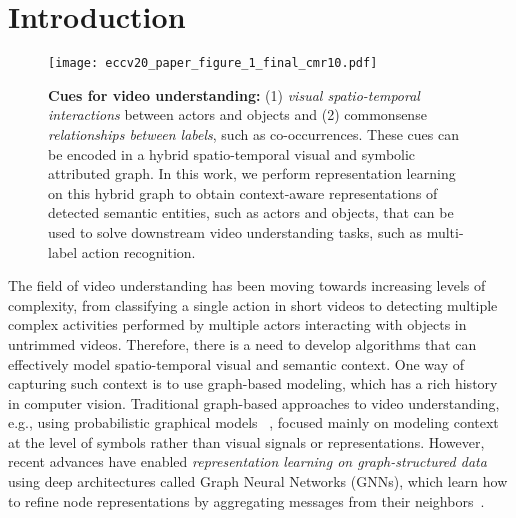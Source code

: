 \documentclass[runningheads]{llncs}
\begin{document}
\section{Introduction}
\label{sec:intro}
\begin{figure}[t]
\centering
\texttt{[image: eccv20\_paper\_figure\_1\_final\_cmr10.pdf]}

   \caption{\textbf{Cues for video understanding:} (1) \emph{visual spatio-temporal interactions} between actors and objects and 
   (2)  commonsense 
   \emph{relationships between labels}, such 
   as co-occurrences. These cues can be encoded in a hybrid spatio-temporal 
   visual and symbolic attributed graph. In this work, we perform 
   representation learning on this hybrid graph to obtain context-aware 
   representations of detected semantic entities, such as actors and objects, that can be used to solve downstream video understanding tasks, such as multi-label action recognition.}
\label{fig:motivation}
\end{figure}
The field of video understanding has been moving towards increasing levels of 
complexity, from classifying a single action in short videos to 
detecting multiple complex activities performed by multiple actors 
interacting with objects in untrimmed videos. Therefore, there is a need to develop 
algorithms that can effectively model spatio-temporal visual and semantic 
context. One way of capturing such context is to use graph-based modeling, 
which has a rich history in computer vision.  Traditional graph-based approaches to video understanding, e.g., using probabilistic graphical models~
\cite{Koller:CVPR94,Koppula:IJRR13,Zhu:CVPR13,Wang:CVPR15}, focused mainly on modeling context at the 
level of symbols rather than visual signals or representations. However, recent 
advances have enabled \emph{representation learning on 
graph-structured data} using deep architectures called Graph Neural Networks 
(GNNs), which learn how to refine node representations by 
aggregating messages from their neighbors~\cite{Kipf:ICLR17}.
\end{document}

